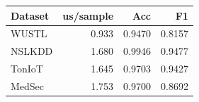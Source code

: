 \begin{tabular}{lrrr}
\toprule
Dataset & us/sample & Acc & F1 \\
\midrule
WUSTL & 0.933 & 0.9470 & 0.8157 \\
NSLKDD & 1.680 & 0.9946 & 0.9477 \\
TonIoT & 1.645 & 0.9703 & 0.9427 \\
MedSec & 1.753 & 0.9700 & 0.8692 \\
\bottomrule
\end{tabular}
